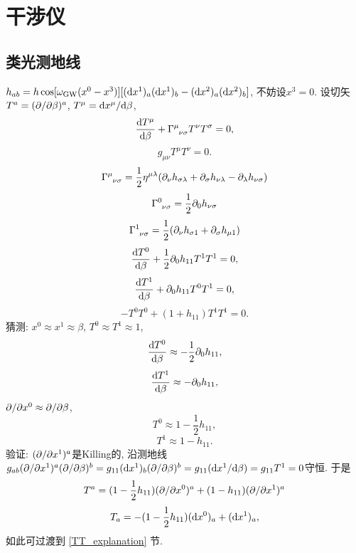 \chapter{干涉仪}

\section{类光测地线}

$h_{ab}=h\cos[\omega_\text{GW}(x^0-x^3)][(\mathrm{d} x^1)_a(\mathrm{d} x^1)_b-(\mathrm{d} x^2)_a(\mathrm{d} x^2)_b]$, 不妨设$x^3=0$. 设切矢$T^a=(\partial/\partial \beta)^a$, $T^\mu=\mathrm{d} x^\mu/\mathrm{d} \beta$,
\begin{equation}
    \frac{\d T^\mu}{\d \beta}+\Gamma^{\mu}_{\ph{\mu}\nu\sigma}T^\nu T^\sigma=0,
\end{equation}
\begin{equation}
    g_{\mu\nu}T^\mu T^\nu=0.
\end{equation}
\begin{equation}
    \Gamma^{\mu}_{\ph{\mu}\nu\sigma}=\frac{1}{2}\eta^{\mu\lambda}(\p_{\nu}h_{\sigma\lambda}+\p_{\sigma}h_{\nu\lambda}-\p_{\lambda}h_{\nu\sigma})
\end{equation}
\begin{equation}
    \Gamma^{0}_{\ph{0}\nu\sigma}=\frac{1}{2}\p_{0}h_{\nu\sigma}
\end{equation}
\begin{equation}
    \Gamma^{1}_{\ph{1}\nu\sigma}=\frac{1}{2}(\p_{\nu}h_{\sigma1}+\p_{\sigma}h_{\mu1})
\end{equation}
\begin{equation}
    \frac{\mathrm{d} T^0}{\mathrm{d} \beta}+\frac{1}{2}\partial_0h_{11}T^1 T^1=0,
\end{equation}
\begin{equation}
    \frac{\mathrm{d} T^1}{\mathrm{d} \beta}+\partial_0h_{11}T^0 T^1=0,
\end{equation}
\begin{equation}
    -T^0 T^0+(1+h_{11})T^1 T^1=0.
\end{equation}
猜测: $x^0\approx x^1\approx\beta$, $T^0\approx T^1\approx1$,
\begin{equation}
    \frac{\mathrm{d} T^0}{\mathrm{d} \beta}\approx-\frac{1}{2}\partial_0h_{11},
\end{equation}
\begin{equation}
    \frac{\mathrm{d} T^1}{\mathrm{d} \beta}\approx-\partial_0h_{11},
\end{equation}
$\partial/\partial x^0\approx\partial/\partial \beta$,
\begin{equation}
    T^0\approx1-\frac{1}{2}h_{11},
\end{equation}
\begin{equation}
    T^1\approx1-h_{11}.
\end{equation}
验证: $(\partial/\partial x^1)^a$是Killing的, 沿测地线$g_{ab}(\partial/\partial x^1)^a(\partial/\partial\beta)^b=g_{11}(\mathrm{d} x^1)_b(\partial/\partial\beta)^b=g_{11}(\mathrm{d} x^1/\mathrm{d}\beta)=g_{11}T^{1}=0$守恒. 于是
\begin{equation}
    T^a=(1-\frac{1}{2}h_{11})(\partial/\partial x^0)^a+(1-h_{11})(\partial/\partial x^1)^a
\end{equation}
\begin{equation}
    T_a=-(1-\frac{1}{2}h_{11})(\mathrm{d} x^0)_a+(\mathrm{d} x^1)_a,
\end{equation}
如此可过渡到 \ref{TT_explanation} 节.

